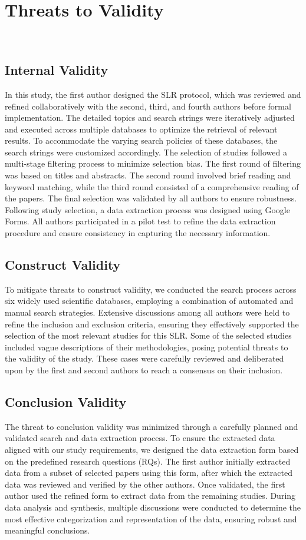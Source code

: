 \section{Threats to Validity}~\label{sec:Threats}
\subsection{Internal Validity}
In this study, the first author designed the SLR protocol, which was reviewed and refined collaboratively with the second, third, and fourth authors before formal implementation. The detailed topics and search strings were iteratively adjusted and executed across multiple databases to optimize the retrieval of relevant results. To accommodate the varying search policies of these databases, the search strings were customized accordingly. The selection of studies followed a multi-stage filtering process to minimize selection bias. The first round of filtering was based on titles and abstracts. The second round involved brief reading and keyword matching, while the third round consisted of a comprehensive reading of the papers. The final selection was validated by all authors to ensure robustness. Following study selection, a data extraction process was designed using Google Forms. All authors participated in a pilot test to refine the data extraction procedure and ensure consistency in capturing the necessary information.

\subsection{Construct Validity}
To mitigate threats to construct validity, we conducted the search process across six widely used scientific databases, employing a combination of automated and manual search strategies. Extensive discussions among all authors were held to refine the inclusion and exclusion criteria, ensuring they effectively supported the selection of the most relevant studies for this SLR. Some of the selected studies included vague descriptions of their methodologies, posing potential threats to the validity of the study. These cases were carefully reviewed and deliberated upon by the first and second authors to reach a consensus on their inclusion.

\subsection{Conclusion Validity}
The threat to conclusion validity was minimized through a carefully planned and validated search and data extraction process. To ensure the extracted data aligned with our study requirements, we designed the data extraction form based on the predefined research questions (RQs). The first author initially extracted data from a subset of selected papers using this form, after which the extracted data was reviewed and verified by the other authors. Once validated, the first author used the refined form to extract data from the remaining studies. During data analysis and synthesis, multiple discussions were conducted to determine the most effective categorization and representation of the data, ensuring robust and meaningful conclusions.


